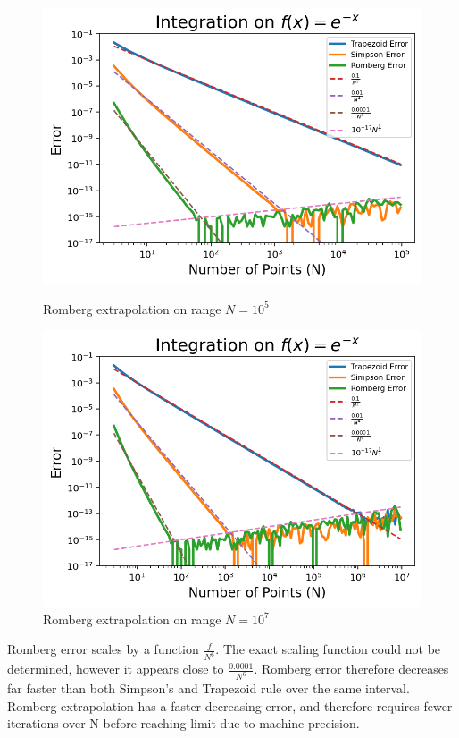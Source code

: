 \documentclass[aps,prb,groupedaddress,nofootinbib,floatfix]{revtex4}
\begin{document}
\begin{figure}
	\begin{minipage}[c]{0.4\linewidth}
		\includegraphics[width=\linewidth]{Plot4(10^5).png}
		\caption{Romberg extrapolation on range $N=10^{5}$ }
		\label{fig:Plot7}
	\end{minipage}
	\begin{minipage}[c]{0.4\linewidth}
		\includegraphics[width=\linewidth]{Plot4(10^7).png}
		\caption{Romberg extrapolation on range $N=10^{7}$ }
		\label{fig:Plot8}
	\end{minipage}
\end{figure}
Romberg error scales by a function $\frac{f}{N^{6}}$. The exact scaling function could not be determined, however it appears close to $\frac{0.0001}{N^{6}}$. Romberg error therefore decreases far faster than both Simpson's and Trapezoid rule over the same interval. Romberg extrapolation has a faster decreasing error, and therefore requires fewer iterations over N before reaching limit due to machine precision.
\end{document}
